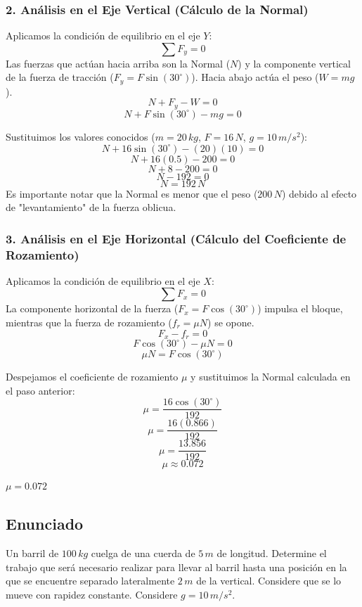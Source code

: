 \documentclass[12pt, a4paper]{article}
\begin{document}
\subsubsection*{2. Análisis en el Eje Vertical (Cálculo de la Normal)}
Aplicamos la condición de equilibrio en el eje $Y$:
$$\sum F_y = 0$$
Las fuerzas que actúan hacia arriba son la Normal ($N$) y la componente vertical de la fuerza de tracción ($F_y = F \sin(30^\circ)$). Hacia abajo actúa el peso ($W = mg$).
$$N + F_y - W = 0$$
$$N + F \sin(30^\circ) - mg = 0$$

Sustituimos los valores conocidos ($m = 20 \, \si{kg}$, $F = 16 \, \si{N}$, $g = 10 \, \si{m/s^2}$):
$$N + 16 \sin(30^\circ) - (20)(10) = 0$$
$$N + 16 (0.5) - 200 = 0$$
$$N + 8 - 200 = 0$$
$$N - 192 = 0$$
$$N = 192 \, \si{N}$$
Es importante notar que la Normal es menor que el peso ($200 \, \si{N}$) debido al efecto de "levantamiento" de la fuerza oblicua.

\subsubsection*{3. Análisis en el Eje Horizontal (Cálculo del Coeficiente de Rozamiento)}
Aplicamos la condición de equilibrio en el eje $X$:
$$\sum F_x = 0$$
La componente horizontal de la fuerza ($F_x = F \cos(30^\circ)$) impulsa el bloque, mientras que la fuerza de rozamiento ($f_r = \mu N$) se opone.
$$F_x - f_r = 0$$
$$F \cos(30^\circ) - \mu N = 0$$
$$\mu N = F \cos(30^\circ)$$

Despejamos el coeficiente de rozamiento $\mu$ y sustituimos la Normal calculada en el paso anterior:
$$\mu = \frac{16 \cos(30^\circ)}{192}$$
$$\mu = \frac{16 (0.866)}{192}$$
$$\mu = \frac{13.856}{192}$$
$$\mu \approx 0.072$$

\begin{tcolorbox}[colback=green!5!white, colframe=green!50!black, title=Respuesta Final]
\centering \Large $\mu = 0.072$
\end{tcolorbox}

\newpage

\subsection*{Enunciado}
Un barril de $100 \, \si{kg}$ cuelga de una cuerda de $5 \, \si{m}$ de longitud. Determine el trabajo que será necesario realizar para llevar al barril hasta una posición en la que se encuentre separado lateralmente $2 \, \si{m}$ de la vertical. Considere que se lo mueve con rapidez constante. Considere $g = 10 \, \si{m/s^2}$.
\end{document}
